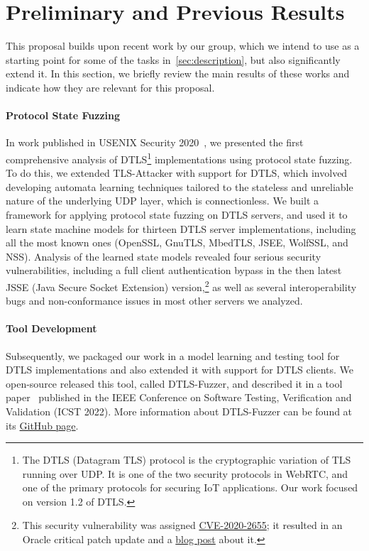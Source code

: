 \documentclass[11pt]{article}
\newcommand{\system}[1]{\mbox{\textsf{#1}}}
\newcommand{\myparagraph}{}
\let\myparagraph=\paragraph
\renewcommand{\paragraph}{\vspace{-3mm}\myparagraph}
\begin{document}
\section{Preliminary and Previous Results} \label{sec:prelim}
This proposal builds upon recent work by our group, which we intend to use as
a starting point for some of the tasks in~\cref{sec:description}, but also
significantly extend it.  In this section, we briefly review the main results
of these works and indicate how they are relevant for this proposal.

\myparagraph{Protocol State Fuzzing}
In work published in USENIX Security 2020~\cite{DTLS@USENIX-20}, we presented
the first comprehensive analysis of DTLS\footnote{The DTLS (Datagram TLS)
protocol is the cryptographic variation of TLS running over UDP. It is one of
the two security protocols in WebRTC, and one of the primary protocols for
securing IoT applications. Our work focused on version 1.2 of DTLS.}
implementations using protocol state fuzzing.  To do this, we extended
TLS-Attacker
with support for DTLS, which involved developing automata learning techniques
tailored to the stateless and unreliable nature of the underlying UDP layer,
which is connectionless.  We built a framework for applying protocol state
fuzzing on DTLS servers, and used it to learn state machine models for
thirteen DTLS server implementations, including all the most known ones
(OpenSSL, GnuTLS, MbedTLS, JSEE, WolfSSL, and NSS).
%
Analysis of the learned state models revealed four serious security
vulnerabilities, including a full client authentication bypass in the then
latest JSSE (Java Secure Socket Extension) version,\footnote{This security
vulnerability was assigned
\href{https://nvd.nist.gov/vuln/detail/CVE-2020-2655}{CVE-2020-2655}; it
resulted in an Oracle critical patch update and a
\href{https://web-in-security.blogspot.com/2020/01/cve-2020-2655-jsse-client.html}{blog
  post} about it.} as well as several interoperability bugs and
non-conformance issues in most other servers we analyzed.

\myparagraph{Tool Development}
Subsequently, we packaged our work in a model learning and testing tool for
DTLS implementations and also extended it with support for DTLS clients. We
open-source released this tool, called \system{DTLS-Fuzzer}, and described it
in a tool paper~\cite{DTLS-Fuzzer@ICST-22} published in the IEEE Conference on
Software Testing, Verification and Validation (ICST 2022).
%
More information about \system{DTLS-Fuzzer} can be found at its
\href{https://github.com/assist-project/dtls-fuzzer/}{GitHub page}.
\end{document}
